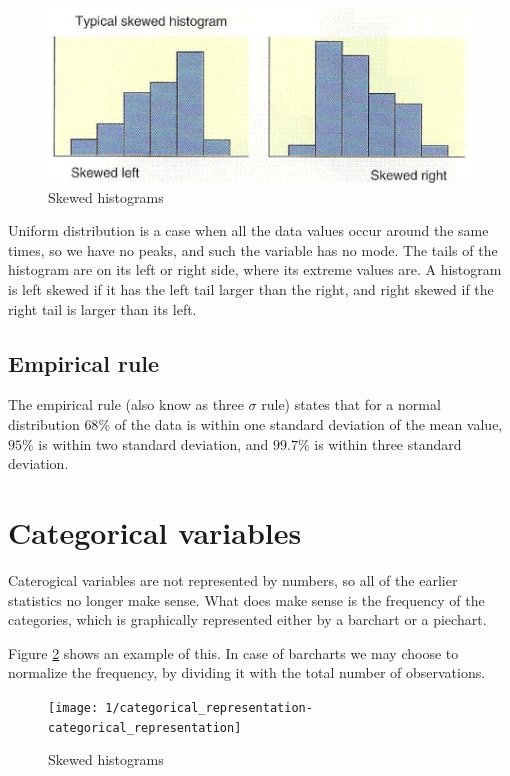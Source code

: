 \begin{figure}[htbp]
\label{fig:histogram_skewed}
\caption{Skewed histograms}
\includegraphics{img/skewed.png}
\end{figure}

Uniform distribution is a case when all the data values occur around the same
times, so we have no peaks, and such the variable has no mode. The tails of the
histogram are on its left or right side, where its extreme values are. A
histogram is left skewed if it has the left tail larger than the right, and
right skewed if the right tail  is larger than its left. 

\subsection{Empirical rule}

The empirical rule (also know as three $\sigma$ rule) states that for a normal
distribution $68\%$ of the data is within one standard deviation of the mean
value, $95\%$ is within two standard deviation, and $99.7\%$ is within three
standard deviation.

\section{Categorical variables}

Caterogical variables are not represented by numbers, so all of the earlier
statistics no longer make sense. What does make sense is the frequency of the
categories, which is graphically represented either by a barchart or a piechart.

Figure \ref{fig:category_representation} shows an example of this. In case of
barcharts we may choose to normalize the frequency, by dividing it with the
total number of observations.

\begin{figure}[htbp]
\label{fig:category_representation}
\caption{Skewed histograms}
\texttt{[image: 1/categorical\_representation-categorical\_representation]}
\end{figure}